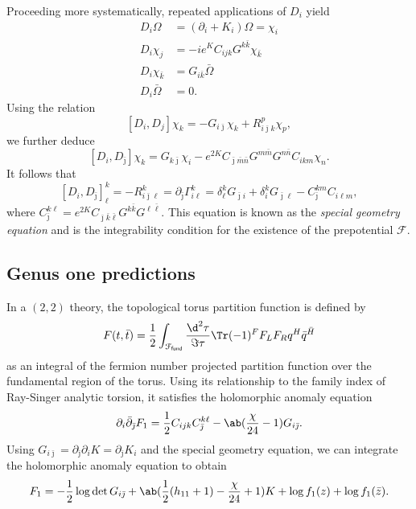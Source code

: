 \documentclass[10pt]{amsart}
\theoremstyle{definition}
\theoremstyle{remark}
\theoremstyle{plain}
\theoremstyle{definition}
\theoremstyle{remark}
\newcommand{\mc}[1]{\mathcal{#1}}
\newcommand{\ms}[1]{\mathsf{#1}}
\newcommand{\1}{\mathbf{1}}
\newcommand{\2}{\mathbf{2}}
\newcommand{\3}{\mathbf{3}}
\begin{document}
Proceeding more systematically, repeated applications of $D_i$ yield
\begin{align*}
    D_i \Omega &= (\partial_i + K_i)\Omega = \chi_i \\
    D_i \chi_j &= -ie^{K} C_{ijk} G^{k\bar{k}}\chi_{\bar{k}} \\
    D_i \chi_{\bar{k}} &= G_{i\bar{k}} \bar{\Omega} \\
    D_i \bar{\Omega} &= 0.
\end{align*}
Using the relation
\[ [D_i, D_j] \chi_k = -G_{i\bar{\jmath}} \chi_k + R_{i\bar{\jmath}k}^p \chi_p, \]
we further deduce
\[ [D_i, D_{\bar{\jmath}}] \chi_k  = G_{k\bar{\jmath}} \chi_i - e^{2K} C_{\bar{\jmath}\bar{m}\bar{n}} G^{m\bar{m}} G^{n\bar{n}} C_{ikm} \chi_n. \]
It follows that
\[ [D_i, D_{\bar{\jmath}}]_{\ell}^k = -R_{i\bar{\jmath}\ell}^k = \partial_{\bar{\jmath}} \Gamma_{i\ell}^k = \delta_{\ell}^k G_{\bar{\jmath}i} + \delta_i^k G_{\bar{\jmath}\ell} - C_{\bar{\jmath}}^{km} C_{i\ell m}, \]
where $C_{\bar{\jmath}}^{k\ell} = e^{2K} C_{\bar{\jmath}\bar{k}\bar{\ell}} G^{k\bar{k}} G^{\ell\bar{\ell}}$. This equation is known as the \textit{special geometry equation} and is the integrability condition for the existence of the prepotential $\mc{F}$.

\subsection{Genus one predictions}%
\label{sub:Genus one predictions}

In a $(2,2)$ theory, the topological torus partition function is defined by
\[ F(t, \bar{t}) = \frac{1}{2} \int_{\mc{F}_{\ms{fund}}} \frac{\d^2 \tau}{\Im \tau} \Tr(-1)^F F_L F_R q^H \bar{q}^{\bar{H}} \]
as an integral of the fermion number projected partition function over the fundamental region of the torus. Using its relationship to the family index of Ray-Singer analytic torsion, it satisfies the holomorphic anomaly equation
\[ \partial_i \bar{\partial}_{\bar{\jmath}} F_1 = \frac{1}{2} C_{ijk} C_{\bar{\jmath}}^{k\ell} - \ab(\frac{\chi}{24}-1) G_{i\bar{\jmath}}. \]
Using $G_{i\bar{\jmath}} = \partial_{\bar{\jmath}} \partial_i K = \partial_{\bar{\jmath}} K_i$ and the special geometry equation, we can integrate the holomorphic anomaly equation to obtain
\begin{equation}\label{eqn:f1}
 F_1 = -\frac{1}{2} \log \det G_{i\bar{\jmath}} + \ab(\frac{1}{2}(h_{11}+1) - \frac{\chi}{24} + 1)K + \log f_1(z) + \log f_1(\bar{z}). 
\end{equation}
\end{document}
